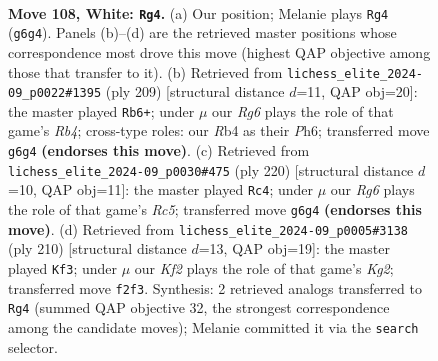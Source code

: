 \documentclass[11pt]{article}
\begin{document}
\clearpage

\begin{figure}[p]\centering
\begin{subfigure}{0.46\textwidth}\centering
\resizebox{\linewidth}{!}{%
\newchessgame
\chessboard[
  setfen={8/3k4/4p1R1/r3P3/1R3P2/8/5K2/8 w - - 1 108},
  showmover=false,
  pgfstyle=straightmove, color=movearrow, markmove={g6-g4}
]}
\caption{}
\end{subfigure}\hfill
\begin{subfigure}{0.46\textwidth}\centering
\resizebox{\linewidth}{!}{%
\newchessgame
\chessboard[
  setfen={5k2/R5p1/3K3p/1r2P2P/8/8/8/8 b - - 29 105},
  showmover=false,
  pgfstyle=straightmove, color=movearrow, markmove={b5-b6}
]}
\caption{}
\end{subfigure}
\\[4pt]
\begin{subfigure}{0.46\textwidth}\centering
\resizebox{\linewidth}{!}{%
\newchessgame
\chessboard[
  setfen={8/8/7k/2R4p/7P/6P1/7K/1r6 w - - 67 111},
  showmover=false,
  pgfstyle=straightmove, color=movearrow, markmove={c5-c4}
]}
\caption{}
\end{subfigure}\hfill
\begin{subfigure}{0.46\textwidth}\centering
\resizebox{\linewidth}{!}{%
\newchessgame
\chessboard[
  setfen={8/4R2P/6p1/6Pr/3k4/4p3/6K1/8 w - - 3 106},
  showmover=false,
  pgfstyle=straightmove, color=movearrow, markmove={g2-f3}
]}
\caption{}
\end{subfigure}
\caption{\textbf{Move 108, White: \texttt{Rg4}.} (a) Our position; Melanie plays \texttt{Rg4} (\texttt{g6g4}). Panels (b)--(d) are the retrieved master positions whose correspondence most drove this move (highest QAP objective among those that transfer to it). (b) Retrieved from \texttt{lichess\_elite\_2024-09\_p0022\#1395} (ply 209) [structural distance $d$=11, QAP obj=20]: the master played \texttt{Rb6+}; under $\mu$ our \emph{Rg6} plays the role of that game's \emph{Rb4}; cross-type roles: our \emph{R}b4 as their \emph{P}h6; transferred move \texttt{g6g4} \textbf{(endorses this move)}. (c) Retrieved from \texttt{lichess\_elite\_2024-09\_p0030\#475} (ply 220) [structural distance $d$=10, QAP obj=11]: the master played \texttt{Rc4}; under $\mu$ our \emph{Rg6} plays the role of that game's \emph{Rc5}; transferred move \texttt{g6g4} \textbf{(endorses this move)}. (d) Retrieved from \texttt{lichess\_elite\_2024-09\_p0005\#3138} (ply 210) [structural distance $d$=13, QAP obj=19]: the master played \texttt{Kf3}; under $\mu$ our \emph{Kf2} plays the role of that game's \emph{Kg2}; transferred move \texttt{f2f3}. Synthesis: 2 retrieved analogs transferred to \texttt{Rg4} (summed QAP objective 32, the strongest correspondence among the candidate moves); Melanie committed it via the \texttt{search} selector.}
\label{fig:thought-m214}
\end{figure}
\end{document}
